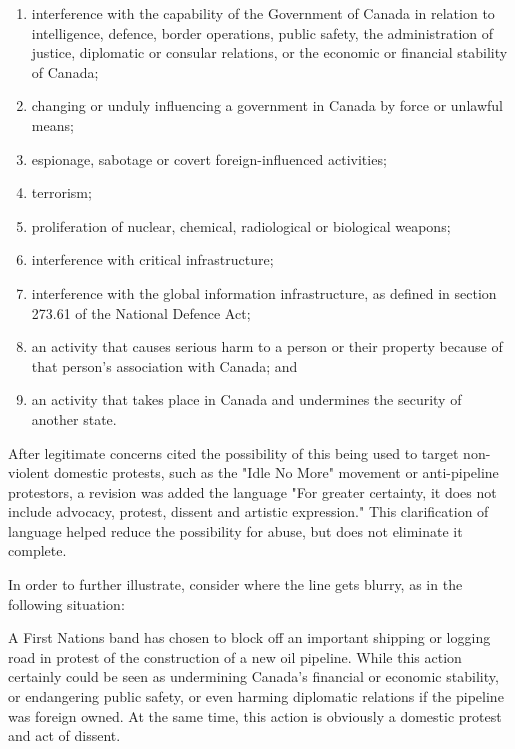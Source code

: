 \documentclass[a4paper, 11pt]{article} %
\begin{document}
\begin{enumerate}
    \item interference with the capability of the Government of Canada in relation to intelligence, defence, border operations, public safety, the administration of justice, diplomatic or consular relations, or the economic or financial stability of Canada;
    \item changing or unduly influencing a government in Canada by force or unlawful means;
    \item espionage, sabotage or covert foreign-influenced activities;
    \item terrorism;
    \item proliferation of nuclear, chemical, radiological or biological weapons;
    \item interference with critical infrastructure;
    \item interference with the global information infrastructure, as defined in section 273.61 of the National Defence Act;
    \item an activity that causes serious harm to a person or their property because of that person's association with Canada; and
    \item an activity that takes place in Canada and undermines the security of another state.
\end{enumerate}

After legitimate concerns cited the possibility of this being used to target non-violent domestic protests, such as the "Idle No More" movement or anti-pipeline protestors, a revision was added the language "For greater certainty, it does not include advocacy, protest, dissent and artistic expression." This clarification of language helped reduce the possibility for abuse, but does not eliminate it complete.

In order to further illustrate, consider where the line gets blurry, as in the following situation:

\begin{displayquote}
A First Nations band has chosen to block off an important shipping or logging road in protest of the construction of a new oil pipeline. While this action certainly could be seen as undermining Canada's financial or economic stability, or endangering public safety, or even harming diplomatic relations if the pipeline was foreign owned. At the same time, this action is obviously a domestic protest and act of dissent.
\end{displayquote}
\end{document}
